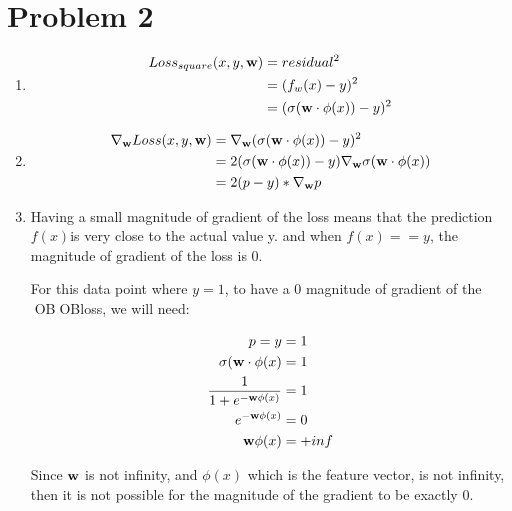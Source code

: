 \documentclass[12pt]{article}
\begin{document}
\section*{Problem 2}
\begin{enumerate}[label=(\alph*)]
\item
\begin{equation}
\begin{aligned}
   Loss_{square}(x, y, \bold{w}) &= residual^2  \\
    &= (f_w(x) - y) ^2 \\
    &= (\sigma(\bold{w}\cdot \phi(x)) - y) ^2
\end{aligned}
\end{equation}

\item
\begin{equation}
\begin{aligned}
    \nabla_{\bold{w}} Loss(x, y, \bold{w}) & =
    \nabla_{\bold{w}}(\sigma(\bold{w}\cdot \phi(x)) - y) ^2 \\
    & = 2(\sigma(\bold{w}\cdot \phi(x)) - y) \nabla_{\bold{w}}\sigma(\bold{w}\cdot \phi(x)) \\
    & = 2(p-y) * \nabla_{\bold{w}}p
\end{aligned}
\end{equation}
\item

Having a small magnitude of gradient of the loss means that the prediction \(f(x)\)is very close to the actual value y. and when \(f(x) == y\), the magnitude of gradient of the loss is 0.

For this data point where \(y = 1\), to have a 0 magnitude of gradient of the OBOBloss, we will need:

\begin{equation}
\begin{aligned}
    p  = y &= 1 \\
    \sigma(\bold{w}\cdot \phi(x) & = 1 \\
    \frac{1}{1 + e^{-\bold{w}\phi(x)}} & = 1  \\
    e^{-\bold{w}\phi(x)} &= 0  \\
    \bold{w}\phi(x) &= + inf
\end{aligned}
\end{equation}

Since \(\bold{w}\) is not infinity, and \(\phi(x)\) which is the feature vector, is not infinity, then it is not possible for the magnitude of the gradient to be exactly 0.
\end{enumerate}
\end{document}
